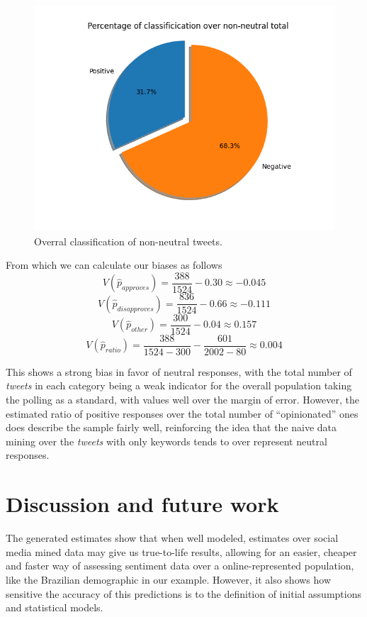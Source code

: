 \documentclass[conference]{IEEEtran}
\begin{document}
\begin{figure}[H]
\centering
\includegraphics[width=\linewidth]{./pieTweet.png}
\caption{\label{fig:nonneutral}Overral classification of non-neutral tweets.}
\end{figure}

From which we can calculate our biases as follows
$$ V(\hat{p}_{approves}) = \frac{388}{1524} - 0.30 \approx -0.045 $$
$$ V(\hat{p}_{disapproves}) = \frac{836}{1524} - 0.66 \approx -0.111 $$
$$ V(\hat{p}_{other}) = \frac{300}{1524} - 0.04 \approx 0.157 $$
$$ V(\hat{p}_{ratio}) = \frac{388}{1524 - 300} - \frac{601}{2002 - 80} \approx 0.004 $$

This shows a strong bias in favor of neutral responses, with the total number of \emph{tweets} in each category being a weak indicator for the overall population taking the polling as a standard, with values well over the margin of error. However, the estimated ratio of positive responses over the total number of ``opinionated'' ones does describe the sample fairly well, reinforcing the idea that the naive data mining over the \emph{tweets} with only keywords tends to over represent neutral responses.

\section{Discussion and future work}
\label{sec:org1080803}
The generated estimates show that when well modeled, estimates over social media mined data may give us true-to-life results, allowing for an easier, cheaper and faster way of assessing sentiment data over a online-represented population, like the Brazilian demographic in our example. However, it also shows how sensitive the accuracy of this predictions is to the definition of initial assumptions and statistical models.
\end{document}
